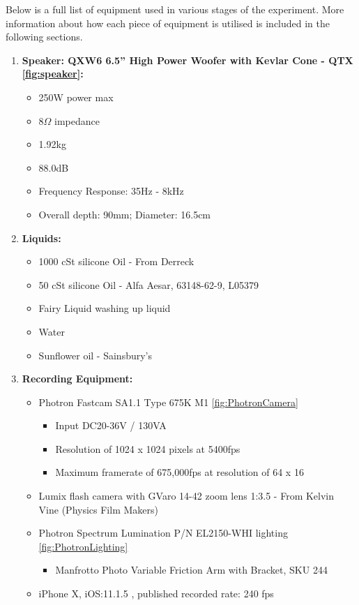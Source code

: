 Below is a full list of equipment used in various stages of the experiment. More information about how each piece of equipment is utilised is included in the following sections.
\bigskip
\begin{enumerate}

\item \textbf{Speaker: QXW6 6.5'' High Power Woofer with Kevlar Cone - QTX \ref{fig:speaker}:}

\begin{itemize}
\item 250W power max
\item 8$\Omega$ impedance
\item 1.92kg
\item 88.0dB
\item Frequency Response: 35Hz - 8kHz
\item Overall depth: 90mm; Diameter: 16.5cm
\end{itemize}
\item \textbf{Liquids:}

\begin{itemize}
\item 1000 cSt silicone Oil - From Derreck
\item 50 cSt silicone Oil - Alfa Aesar, 63148-62-9, L05379
\item Fairy Liquid washing up liquid
\item Water
\item Sunflower oil - Sainsbury's
\end{itemize}
\item \textbf{Recording Equipment:}

\begin{itemize}
\item Photron Fastcam SA1.1 Type 675K M1 \ref{fig:PhotronCamera}

\begin{itemize}
\item Input DC20-36V / 130VA
\item Resolution of 1024 x 1024 pixels at 5400fps
\item Maximum framerate of 675,000fps at resolution of 64 x 16
\end{itemize}
\item Lumix flash camera with GVaro 14-42 zoom lens 1:3.5 - From Kelvin Vine (Physics Film Makers)
\item Photron Spectrum Lumination P/N EL2150-WHI lighting \ref{fig:PhotronLighting}

\begin{itemize}
\item Manfrotto Photo Variable Friction Arm with Bracket, SKU 244
\end{itemize}
\item iPhone X, iOS:11.1.5 , published recorded rate: 240 fps


\end{itemize}
\end{enumerate}
